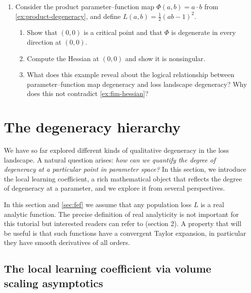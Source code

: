 \documentclass[11pt]{article}
\begin{document}
\begin{exercise}
\begin{enumerate}
\begin{enumerate}
                degeneracy?
        \end{enumerate}
    \item
        Consider the product parameter--function map
            $\Phi(a,b) = a \cdot b$
        from \cref{ex:product-degeneracy}, and define
        $L(a,b) = \frac{1}{2}(ab - 1)^2$.
        \begin{enumerate}
            \item
                Show that $(0,0)$ is a critical point and that $\Phi$ is
                degenerate in every direction at $(0,0)$.
            \item
                Compute the Hessian at $(0,0)$ and show it is nonsingular.
            \item
                What does this example reveal about the logical relationship
                between parameter--function map degeneracy and loss landscape
                degeneracy? Why does this not contradict \cref{ex:fim-hessian}?
        \end{enumerate}
\end{enumerate}
\end{exercise}


\clearpage
\section{The degeneracy hierarchy}
\label{sec:llc}

We have so far explored different kinds of qualitative degeneracy in the loss landscape. A natural question arises: \emph{how can we quantify the degree of degeneracy at a particular point in parameter space?} In this section, we introduce the local learning coefficient, a rich mathematical object that reflects the degree of degeneracy at a parameter, and we explore it from several perspectives.

In this section and \cref{sec:fef} we assume that any population loss $L$ is a real analytic function. The precise definition of real analyticity is not important for this tutorial but interested readers can refer to \cite{Watanabe2009} (section 2). A property that will be useful is that such functions have a convergent Taylor expansion, in particular they have smooth derivatives of all orders.


\subsection{The local learning coefficient via volume scaling asymptotics}
\label{sec:llc:volume-scaling}
\end{document}
